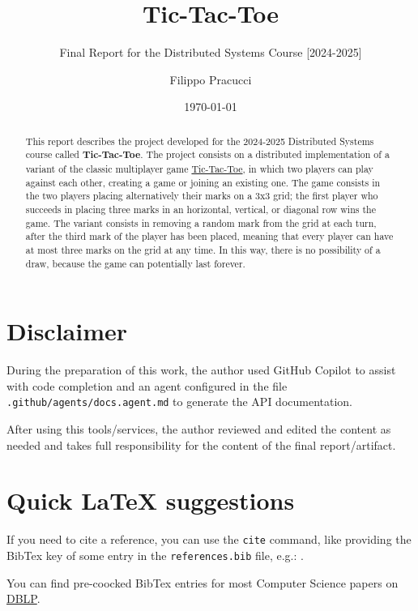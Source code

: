 \documentclass{scrartcl}
\title{\LARGE Tic-Tac-Toe}
\subtitle{Final Report for the Distributed Systems Course [2024-2025]}
\author{Filippo Pracucci \\ \emailaddr{filippo.pracucci@studio.unibo.it}}
\date{\today}
\begin{document}
\maketitle

\begin{abstract}
  This report describes the project developed for the 2024-2025 Distributed Systems course called \textbf{Tic-Tac-Toe}.
  The project consists on a distributed implementation of a variant of the classic multiplayer game
  \href{https://en.wikipedia.org/wiki/Tic-tac-toe}{Tic-Tac-Toe}, in which two players can play against each other,
  creating a game or joining an existing one. The game consists in the two players placing alternatively their marks on
  a 3x3 grid; the first player who succeeds in placing three marks in an horizontal, vertical, or diagonal row wins the
  game. The variant consists in removing a random mark from the grid at each turn, after the third mark of the player
  has been placed, meaning that every player can have at most three marks on the grid at any time. In this way, there
  is no possibility of a draw, because the game can potentially last forever.
\end{abstract}

\section*{Disclaimer}

During the preparation of this work, the author used GitHub Copilot to assist with code completion and an agent
configured in the file \texttt{.github/agents/docs.agent.md} to generate the API documentation.

After using this tools/services, the author reviewed and edited the content as needed 
and takes full responsibility for the content of the final report/artifact.

\section*{Quick \LaTeX{} suggestions}

If you need to cite a reference, you can use the \texttt{cite} command, 
like providing the BibTex key of some entry in the \texttt{references.bib} file, 
e.g.: \cite{adams1995hitchhiker}.

You can find pre-coocked BibTex entries for most Computer Science papers on \href{https://dblp.uni-trier.de/}{DBLP}.
\end{document}
